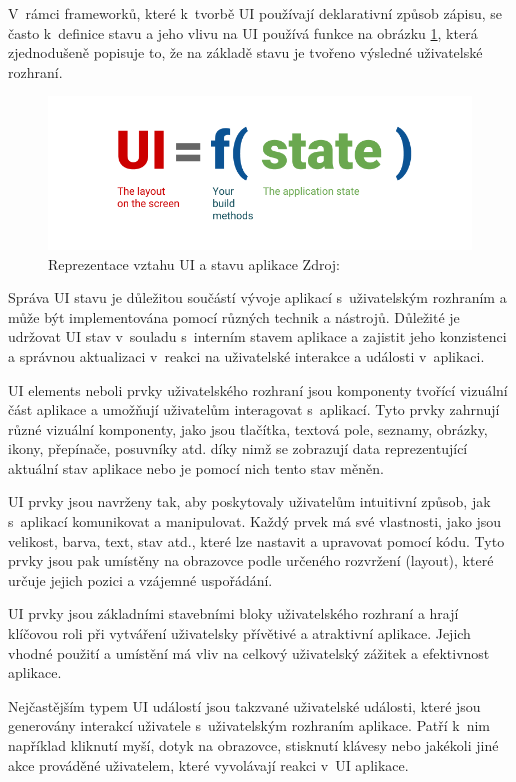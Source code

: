 V~rámci frameworků, které k~tvorbě UI používají deklarativní způsob zápisu, se často k~definice stavu a jeho vlivu na UI používá funkce 
na obrázku \ref{fig:UI_function}, která zjednodušeně popisuje to, že na základě stavu je tvořeno výsledné uživatelské rozhraní.

\begin{figure}[H]
  \centering
  \includegraphics[width=.5\textwidth]{ui-equals-function-of-state.png}
  \caption{Reprezentace vztahu UI a stavu aplikace Zdroj: \cite{imgUIformula}}
  \label{fig:UI_function}
\end{figure}

Správa UI stavu je důležitou součástí vývoje aplikací s~uživatelským rozhraním a může být implementována pomocí různých technik a nástrojů.
Důležité je udržovat UI stav v~souladu s~interním stavem aplikace a zajistit jeho konzistenci a správnou aktualizaci v~reakci na uživatelské 
interakce a události v~aplikaci.

UI elements neboli prvky uživatelského rozhraní jsou komponenty tvořící vizuální část aplikace a umožňují uživatelům interagovat s~aplikací.
Tyto prvky zahrnují různé vizuální komponenty, jako jsou tlačítka, textová pole, seznamy, obrázky, ikony, přepínače, posuvníky atd. díky nimž
se zobrazují data reprezentující aktuální stav aplikace nebo je pomocí nich tento stav měněn.

UI prvky jsou navrženy tak, aby poskytovaly uživatelům intuitivní způsob, jak s~aplikací komunikovat a manipulovat. Každý prvek má své 
vlastnosti, jako jsou velikost, barva, text, stav atd., které lze nastavit a upravovat pomocí kódu. Tyto prvky jsou pak umístěny na obrazovce 
podle určeného rozvržení (layout), které určuje jejich pozici a vzájemné uspořádání.

UI prvky jsou základními stavebními bloky uživatelského rozhraní a hrají klíčovou roli při vytváření uživatelsky přívětivé a atraktivní aplikace. 
Jejich vhodné použití a umístění má vliv na celkový uživatelský zážitek a efektivnost aplikace.

Nejčastějším typem UI událostí jsou takzvané uživatelské události, které jsou generovány interakcí uživatele s~uživatelským rozhraním aplikace. \cite{UIEvents}
Patří k~nim například kliknutí myší, dotyk na obrazovce, stisknutí klávesy nebo jakékoli jiné akce prováděné uživatelem, které vyvolávají reakci
v~UI aplikace.

